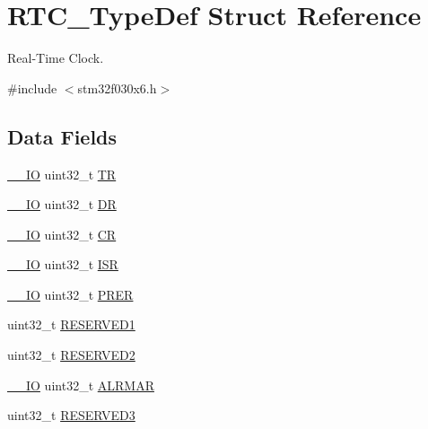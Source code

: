 \hypertarget{struct_r_t_c___type_def}{}\section{R\+T\+C\+\_\+\+Type\+Def Struct Reference}
\label{struct_r_t_c___type_def}


Real-\/\+Time Clock.  




{\ttfamily \#include $<$stm32f030x6.\+h$>$}

\subsection*{Data Fields}
\begin{DoxyCompactItemize}
\item 
\hyperlink{core__sc300_8h_aec43007d9998a0a0e01faede4133d6be}{\+\_\+\+\_\+\+IO} uint32\+\_\+t \hyperlink{struct_r_t_c___type_def_a63d179b7a36a715dce7203858d3be132}{TR}
\item 
\hyperlink{core__sc300_8h_aec43007d9998a0a0e01faede4133d6be}{\+\_\+\+\_\+\+IO} uint32\+\_\+t \hyperlink{struct_r_t_c___type_def_a3df0d8dfcd1ec958659ffe21eb64fa94}{DR}
\item 
\hyperlink{core__sc300_8h_aec43007d9998a0a0e01faede4133d6be}{\+\_\+\+\_\+\+IO} uint32\+\_\+t \hyperlink{struct_r_t_c___type_def_ab40c89c59391aaa9d9a8ec011dd0907a}{CR}
\item 
\hyperlink{core__sc300_8h_aec43007d9998a0a0e01faede4133d6be}{\+\_\+\+\_\+\+IO} uint32\+\_\+t \hyperlink{struct_r_t_c___type_def_ab3c49a96815fcbee63d95e1e74f20e75}{I\+SR}
\item 
\hyperlink{core__sc300_8h_aec43007d9998a0a0e01faede4133d6be}{\+\_\+\+\_\+\+IO} uint32\+\_\+t \hyperlink{struct_r_t_c___type_def_ac9b4c6c5b29f3461ce3f875eea69f35b}{P\+R\+ER}
\item 
uint32\+\_\+t \hyperlink{struct_r_t_c___type_def_ac4ac04e673b5b8320d53f7b0947db902}{R\+E\+S\+E\+R\+V\+E\+D1}
\item 
uint32\+\_\+t \hyperlink{struct_r_t_c___type_def_a4c9b972a304c0e08ca27cbe57627c496}{R\+E\+S\+E\+R\+V\+E\+D2}
\item 
\hyperlink{core__sc300_8h_aec43007d9998a0a0e01faede4133d6be}{\+\_\+\+\_\+\+IO} uint32\+\_\+t \hyperlink{struct_r_t_c___type_def_ac005b1a5bc52634d5a34578cc9d2c3f6}{A\+L\+R\+M\+AR}
\item 
uint32\+\_\+t \hyperlink{struct_r_t_c___type_def_af2b40c5e36a5e861490988275499e158}{R\+E\+S\+E\+R\+V\+E\+D3}

\end{DoxyCompactItemize}
